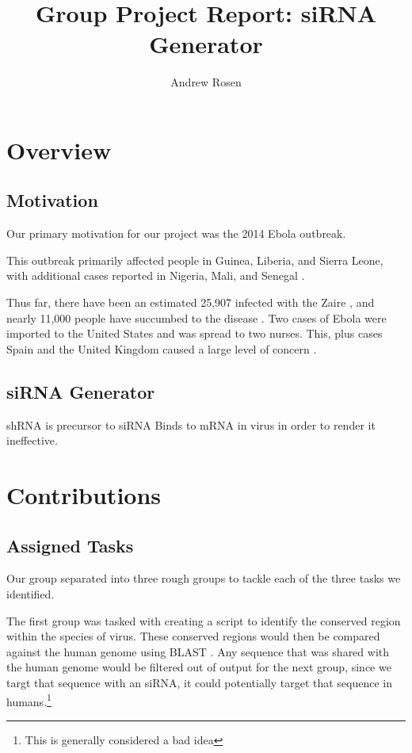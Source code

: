\documentclass[10pt,letterpaper]{article}
\author{Andrew Rosen}
\title{Group Project Report: siRNA Generator}
\date{}
\begin{document}
\maketitle

\section{Overview}


\subsection{Motivation}
Our primary motivation for our project was the 2014 Ebola outbreak.



This outbreak primarily affected people in Guinea, Liberia, and Sierra Leone, with additional cases reported in Nigeria, Mali, and Senegal \cite{centers20152014} .

Thus far, there have been an estimated 25,907 infected with the Zaire , and nearly 11,000 people have succumbed to the disease \cite{centers20152014}.
Two cases of Ebola were imported to the United States and was spread to two nurses. 
This, plus cases Spain and the United Kingdom caused a large level of concern \cite{levin2015ebola} \cite{ready}.

\subsection{siRNA  Generator}
shRNA is precursor to siRNA
Binds to mRNA in virus in order to render it ineffective.

\section{Contributions}




\subsection{Assigned Tasks}
Our group separated into three rough groups to tackle each of the three tasks we identified.

The first group was tasked with creating a script to identify the conserved region within the species of virus.
These conserved regions would then be compared against the human genome using BLAST \cite{blast}.
Any sequence that was shared with the human genome would be filtered out of output for the next group, since we targt that sequence with an siRNA, it could potentially target that sequence in humans.\footnote{This is generally considered a bad idea}
\end{document}
